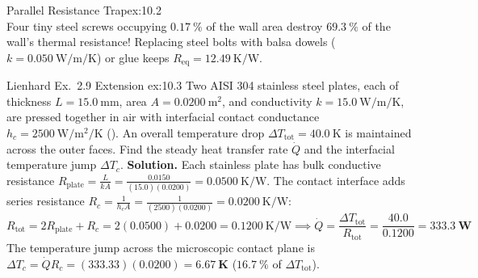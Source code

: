 \begin{workedexample}{Parallel Resistance Trap}{ex:10.2}
\[\]
Four tiny steel screws occupying $\SI{0.17}{\percent}$ of the wall area destroy $\SI{69.3}{\percent}$ of the wall's thermal resistance! Replacing steel bolts with balsa dowels ($k = \SI{0.050}{\watt\per\meter\per\kelvin}$) or glue keeps $R_{\mathrm{eq}} = \SI{12.49}{\kelvin\per\watt}$.
\end{workedexample}

\begin{workedexample}{Lienhard Ex.\ 2.9 Extension }{ex:10.3}
Two AISI 304 stainless steel plates, each of thickness $L = \SI{15.0}{\milli\meter}$, area $A = \SI{0.0200}{\square\meter}$, and conductivity $k = \SI{15.0}{\watt\per\meter\per\kelvin}$, are pressed together in air with interfacial contact conductance $h_c = \SI{2500}{\watt\per\square\meter\per\kelvin}$ (). An overall temperature drop $\Delta T_{\mathrm{tot}} = \SI{40.0}{\kelvin}$ is maintained across the outer faces. Find the steady heat transfer rate $\dot{Q}$ and the interfacial temperature jump $\Delta T_c$.
\tcblower
\textbf{Solution.} Each stainless plate has bulk conductive resistance $R_{\mathrm{plate}} = \frac{L}{kA} = \frac{0.0150}{(15.0)(0.0200)} = \SI{0.0500}{\kelvin\per\watt}$. The contact interface adds series resistance $R_c = \frac{1}{h_c A} = \frac{1}{(2500)(0.0200)} = \SI{0.0200}{\kelvin\per\watt}$:
\[
  R_{\mathrm{tot}} = 2 R_{\mathrm{plate}} + R_c = 2(0.0500) + 0.0200 = \SI{0.1200}{\kelvin\per\watt} \implies
  \dot{Q} = \frac{\Delta T_{\mathrm{tot}}}{R_{\mathrm{tot}}} = \frac{40.0}{0.1200} = \mathbf{\SI{333.3}{\watt}}
\]
The temperature jump across the microscopic contact plane is $\Delta T_c = \dot{Q} R_c = (333.33)(0.0200) = \mathbf{\SI{6.67}{\kelvin}}$ ($\SI{16.7}{\percent}$ of $\Delta T_{\mathrm{tot}}$).
\end{workedexample}

